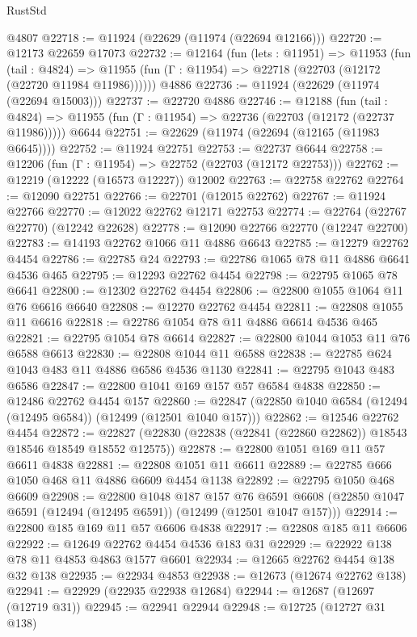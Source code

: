 \begin{lexlean}{RustStd}
\begin{coremodule}
{\begin{coremodule}
{{{{{{{{{{{{{{{{{{{{{{{{{{{{{{{{{{{{{{{{{{{{{{{{{{{{{{{{{{{{{{{{{{{{{{{{{{{{{{{{    @4807
@22718 := @11924 (@22629 (@11974 (@22694 @12166)))
@22720 := @12173 @22659 @17073
@22732 := @12164
    (fun (lets : @11951) =>
    @11953
      (fun (tail : @4824) =>
      @11955 (fun (Γ : @11954) => @22718 (@22703 (@12172 (@22720 @11984 @11986))))))
    @4886
@22736 := @11924 (@22629 (@11974 (@22694 @15003)))
@22737 := @22720 @4886
@22746 := @12188
    (fun (tail : @4824) => @11955 (fun (Γ : @11954) => @22736 (@22703 (@12172 (@22737 @11986)))))
    @6644
@22751 := @22629 (@11974 (@22694 (@12165 (@11983 @6645))))
@22752 := @11924 @22751
@22753 := @22737 @6644
@22758 := @12206 (fun (Γ : @11954) => @22752 (@22703 (@12172 @22753)))
@22762 := @12219 (@12222 (@16573 @12227)) @12002
@22763 := @22758 @22762
@22764 := @12090 @22751
@22766 := @22701 (@12015 @22762)
@22767 := @11924 @22766
@22770 := @12022 @22762 @12171 @22753
@22774 := @22764 (@22767 @22770) (@12242 @22628)
@22778 := @12090 @22766 @22770 (@12247 @22700)
@22783 := @14193 @22762 @1066 @11 @4886 @6643
@22785 := @12279 @22762 @4454
@22786 := @22785 @24
@22793 := @22786 @1065 @78 @11 @4886 @6641 @4536 @465
@22795 := @12293 @22762 @4454
@22798 := @22795 @1065 @78 @6641
@22800 := @12302 @22762 @4454
@22806 := @22800 @1055 @1064 @11 @76 @6616 @6640
@22808 := @12270 @22762 @4454
@22811 := @22808 @1055 @11 @6616
@22818 := @22786 @1054 @78 @11 @4886 @6614 @4536 @465
@22821 := @22795 @1054 @78 @6614
@22827 := @22800 @1044 @1053 @11 @76 @6588 @6613
@22830 := @22808 @1044 @11 @6588
@22838 := @22785 @624 @1043 @483 @11 @4886 @6586 @4536 @1130
@22841 := @22795 @1043 @483 @6586
@22847 := @22800 @1041 @169 @157 @57 @6584 @4838
@22850 := @12486 @22762 @4454 @157
@22860 := @22847 (@22850 @1040 @6584 (@12494 (@12495 @6584)) (@12499 (@12501 @1040 @157)))
@22862 := @12546 @22762 @4454
@22872 := @22827 (@22830 (@22838 (@22841 (@22860 @22862)) @18543 @18546 @18549 @18552 @12575))
@22878 := @22800 @1051 @169 @11 @57 @6611 @4838
@22881 := @22808 @1051 @11 @6611
@22889 := @22785 @666 @1050 @468 @11 @4886 @6609 @4454 @1138
@22892 := @22795 @1050 @468 @6609
@22908 := @22800
    @1048
    @187
    @157
    @76
    @6591
    @6608
    (@22850 @1047 @6591 (@12494 (@12495 @6591)) (@12499 (@12501 @1047 @157)))
@22914 := @22800 @185 @169 @11 @57 @6606 @4838
@22917 := @22808 @185 @11 @6606
@22922 := @12649 @22762 @4454 @4536 @183 @31
@22929 := @22922 @138 @78 @11 @4853 @4863 @1577 @6601
@22934 := @12665 @22762 @4454 @138 @32 @138
@22935 := @22934 @4853
@22938 := @12673 (@12674 @22762 @138)
@22941 := @22929 (@22935 @22938 @12684)
@22944 := @12687 (@12697 (@12719 @31))
@22945 := @22941 @22944
@22948 := @12725 (@12727 @31 @138)
}}}}}}}}}}}}}}}}}}}}}}}}}}}}}}}}}}}}}}}}}}}}}}}}}}}}}}}}}}}}}}}}}}}}}}}}}}}}}}}}
\end{coremodule}}
\end{coremodule}
\end{lexlean}
